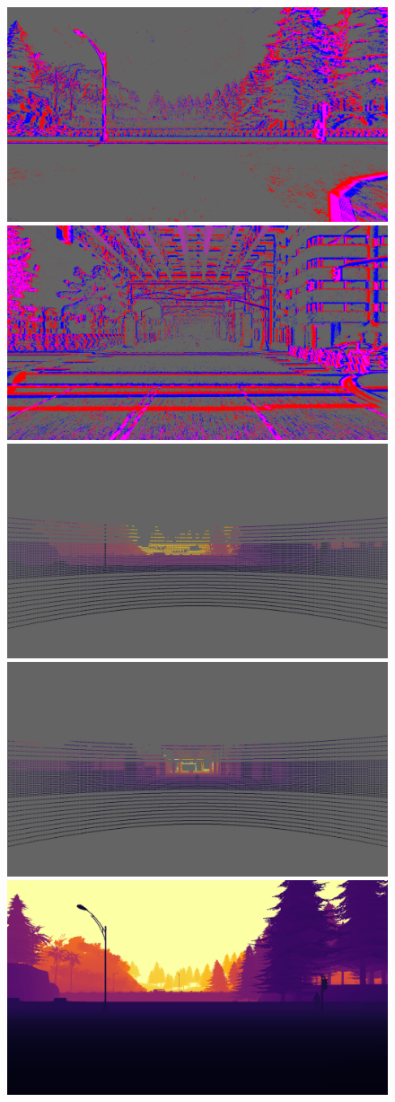 \begin{figure}
  \centering
  \includegraphics[width=0.475\linewidth]{mainmatter/figures/c_depth_transf/sled_dense_cmp_additional/data_and_gt/evts003720_lightgray_fixed.png}
  \includegraphics[width=0.475\linewidth]{mainmatter/figures/c_depth_transf/sled_dense_cmp_additional/data_and_gt/evts006552_lightgray_fixed.png}\\
  \includegraphics[width=0.475\linewidth]{mainmatter/figures/c_depth_transf/sled_dense_cmp_additional/data_and_gt/lidar003720_lightgray_fixed.png}
  \includegraphics[width=0.475\linewidth]{mainmatter/figures/c_depth_transf/sled_dense_cmp_additional/data_and_gt/lidar006552_lightgray_fixed.png}\\
  \includegraphics[width=0.475\linewidth]{mainmatter/figures/c_depth_transf/sled_dense_cmp_additional/data_and_gt/gtprev003720.png}

\end{figure}

